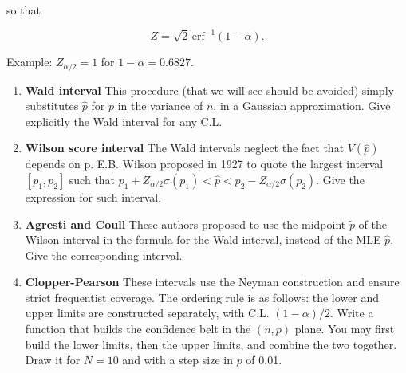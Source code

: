 \documentclass[a4paper,12pt]{article}
\begin{document}
 so that
 
 $$Z = \sqrt{2}\, \text{erf}^{-1} (1-\alpha).$$
 
 Example: $Z_{\alpha/2} = 1$ for $1-\alpha = 0.6827$.
 
 \begin{enumerate}
  \item \textbf{Wald interval} This procedure (that we will see should be avoided) simply substitutes $\hat{p}$ for $p$ in the variance of $n$, in a Gaussian approximation. Give explicitly
  the Wald interval for any C.L.
  \item \textbf{Wilson score interval} The Wald intervals neglect the fact that $V(\hat{p})$ depends on p. E.B. Wilson proposed in 1927 to quote the largest interval $[p_1,p_2]$ such that $p_1 + Z_{\alpha/2} \sigma(p_1) < \hat{p} < p_2-Z_{\alpha/2}\sigma(p_2)$. Give the expression for such interval.
  \item \textbf{Agresti and Coull} These authors proposed to use the midpoint $\tilde{p}$ of the Wilson interval in the formula for the Wald interval, instead of the MLE $\hat{p}$. Give the corresponding interval.
  \item \textbf{Clopper-Pearson} These intervals use the Neyman construction and ensure strict frequentist coverage. The ordering rule is as follows: the lower and upper limits are constructed separately, with C.L. $(1-\alpha)/2$. 
    Write a function that builds the confidence belt in the $(n,p)$ plane. You may first build the lower limits, then the upper limits, and combine the two together. 
   Draw it for $N=10$ and with a step size in $p$ of 0.01.

\end{enumerate}
\end{document}
